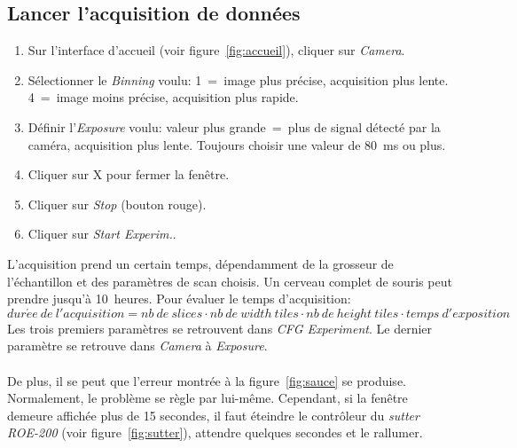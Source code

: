 \subsection{Lancer l'acquisition de données}
\label{start}
\begin{enumerate}
    \item Sur l'interface d'accueil (voir figure~\ref{fig:accueil}), cliquer sur \textit{Camera}.
    \item Sélectionner le \textit{Binning} voulu: 1~=~image plus précise, acquisition plus lente. 4~=~image moins précise, acquisition plus rapide.
    \item Définir l'\textit{Exposure} voulu: valeur plus grande~=~plus de signal détecté par la caméra, acquisition plus lente. Toujours choisir une valeur de 80~ms ou plus.
    \item Cliquer sur X pour fermer la fenêtre.
    \item Cliquer sur \textit{Stop} (bouton rouge).
    \item Cliquer sur \textit{Start Experim.}.
\end{enumerate}
L'acquisition prend un certain temps, dépendamment de la grosseur de l'échantillon et des paramètres de scan choisis. Un cerveau complet de souris peut prendre jusqu'à 10~heures. Pour évaluer le temps d'acquisition: $$dur\acute{e}e~de~l'acquisition = nb~de~slices \cdot nb~de~width~tiles \cdot nb~de~height~tiles \cdot temps~d'exposition$$ Les trois premiers paramètres se retrouvent dans \textit{CFG Experiment}. Le dernier paramètre se retrouve dans \textit{Camera} à \textit{Exposure}.
\\ \\
De plus, il se peut que l'erreur montrée à la figure~\ref{fig:sauce} se produise. Normalement, le problème se règle par lui-même. Cependant, si la fenêtre demeure affichée plus de 15 secondes, il faut éteindre le contrôleur du \textit{sutter ROE-200} (voir figure~\ref{fig:sutter}), attendre quelques secondes et le rallumer.
%
